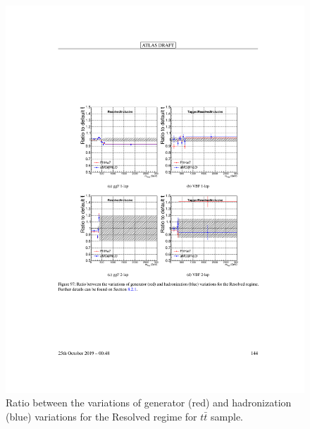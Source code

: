 \begin{figure}[h!]
  \centering
  \includegraphics[width=\hsize]{figures/Analysis/modelingsysts/ttbar_gen_had_res.pdf}
            \caption{Ratio between the variations of generator (red) and hadronization (blue) variations for the Resolved regime for $t\bar{t}$ sample.} 
  \label{fig:ttbar_gen_res}
\end{figure} 
\FloatBarrier



